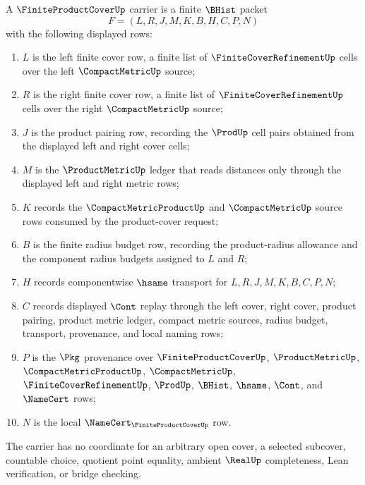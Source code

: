 \begin{definition}
\label{def:finite-product-cover-carrier}
A $\FiniteProductCoverUp$ carrier is a finite $\BHist$ packet
$$
F=(L,R,J,M,K,B,H,C,P,N)
$$
with the following displayed rows:
\begin{enumerate}
\item $L$ is the left finite cover row, a finite list of $\FiniteCoverRefinementUp$ cells over the left $\CompactMetricUp$ source;
\item $R$ is the right finite cover row, a finite list of $\FiniteCoverRefinementUp$ cells over the right $\CompactMetricUp$ source;
\item $J$ is the product pairing row, recording the $\ProdUp$ cell pairs obtained from the displayed left and right cover cells;
\item $M$ is the $\ProductMetricUp$ ledger that reads distances only through the displayed left and right metric rows;
\item $K$ records the $\CompactMetricProductUp$ and $\CompactMetricUp$ source rows consumed by the product-cover request;
\item $B$ is the finite radius budget row, recording the product-radius allowance and the component radius budgets assigned to $L$ and $R$;
\item $H$ records componentwise $\hsame$ transport for $L,R,J,M,K,B,C,P,N$;
\item $C$ records displayed $\Cont$ replay through the left cover, right cover, product pairing, product metric ledger, compact metric sources, radius budget, transport, provenance, and local naming rows;
\item $P$ is the $\Pkg$ provenance over $\FiniteProductCoverUp$, $\ProductMetricUp$, $\CompactMetricProductUp$, $\CompactMetricUp$, $\FiniteCoverRefinementUp$, $\ProdUp$, $\BHist$, $\hsame$, $\Cont$, and $\NameCert$ rows;
\item $N$ is the local $\NameCert_{\FiniteProductCoverUp}$ row.
\end{enumerate}
The carrier has no coordinate for an arbitrary open cover, a selected subcover, countable choice, quotient point equality, ambient $\RealUp$ completeness, Lean verification, or bridge checking.
\end{definition}

